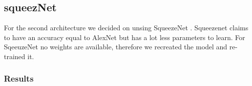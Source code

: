 \documentclass[11pt]{article}
\begin{document}
\subsection{squeezNet}
For the second architecture we decided on unsing SqueezeNet \cite{iandola2016}. Squeezenet claims to have an accuracy equal to AlexNet but has a lot less parameters to learn.  
For SqeeuzeNet no weights are available, therefore we recreated the model and re-trained it. 



\subsubsection{Results}

\newpage


\end{document}
